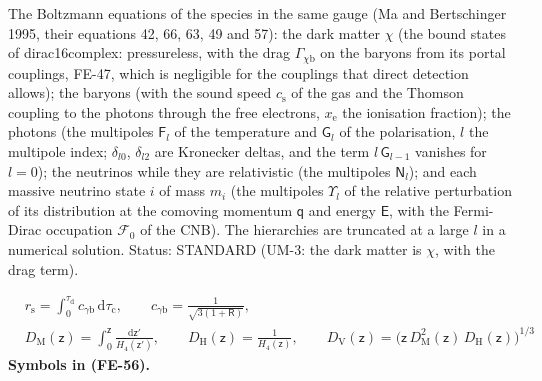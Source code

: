 \documentclass[
  10pt,
]{article}
\begin{document}
The Boltzmann equations of the species in the same gauge (Ma and
Bertschinger 1995, their equations 42, 66, 63, 49 and 57): the dark
matter \(\chi\) (the bound states of dirac16complex: pressureless, with
the drag \(\Gamma_{\chi\mathrm{b}}\) on the baryons from its portal
couplings, FE-47, which is negligible for the couplings that direct
detection allows); the baryons (with the sound speed \(c_{\mathrm{s}}\)
of the gas and the Thomson coupling to the photons through the free
electrons, \(x_{\mathrm{e}}\) the ionisation fraction); the photons (the
multipoles \(\mathsf{F}_l\) of the temperature and \(\mathsf{G}_l\) of
the polarisation, \(l\) the multipole index; \(\delta_{l0}\),
\(\delta_{l2}\) are Kronecker deltas, and the term
\(l\,\mathsf{G}_{l-1}\) vanishes for \(l = 0\)); the neutrinos while
they are relativistic (the multipoles \(\mathsf{N}_l\)); and each
massive neutrino state \(i\) of mass \(m_i\) (the multipoles
\(\Upsilon_l\) of the relative perturbation of its distribution at the
comoving momentum \(\mathsf{q}\) and energy \(\mathsf{E}\), with the
Fermi-Dirac occupation \(\mathcal{F}_0\) of the CNB). The hierarchies
are truncated at a large \(l\) in a numerical solution. Status: STANDARD
(UM-3: the dark matter is \(\chi\), with the drag term).

\[
\begin{aligned}
&r_{\mathrm{s}} = \int_0^{\tau_{\mathrm{d}}}c_{\gamma\mathrm{b}}\,\mathrm{d}\tau_{\mathrm{c}},\qquad c_{\gamma\mathrm{b}} = \frac{1}{\sqrt{3(1 + \mathsf{R})}},\\
&D_{\mathrm{M}}(\mathsf{z}) = \int_0^{\mathsf{z}}\frac{\mathrm{d}\mathsf{z}'}{H_4(\mathsf{z}')},\qquad
 D_{\mathrm{H}}(\mathsf{z}) = \frac{1}{H_4(\mathsf{z})},\qquad
 D_{\mathrm{V}}(\mathsf{z}) = \big(\mathsf{z}\,D_{\mathrm{M}}^2(\mathsf{z})\,D_{\mathrm{H}}(\mathsf{z})\big)^{1/3}
\end{aligned} \tag{FE-56}
\] \textbf{Symbols in (FE-56).}
\end{document}

